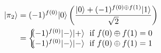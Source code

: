 \documentclass[preview]{standalone}
\begin{document}
\begin{align*}
|\pi_2\rangle &= (-1)^{f(0)}|0\rangle \left( \frac{|0\rangle + (-1)^{f(0)\oplus f(1)} |1\rangle}{\sqrt{2}}\right) \\ &=  \left\{ \begin{array}{ll} \hspace{-3mm} (-1)^{f(0)}|-\rangle |+\rangle \; \text{ if } f(0) \oplus f(1) = 0 \\ \hspace{-3mm} (-1)^{f(0)} |-\rangle |-\rangle \; \text{ if } f(0) \oplus f(1) = 1 \end{array} \right.
\end{align*}
\end{document}

